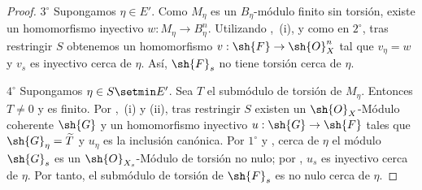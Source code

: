 \begin{proof}
$3^\circ$ Supongamos $\eta\in E'$. Como $M_\eta$ es un $B_\eta$-módulo finito sin torsión, existe un homomorfismo inyectivo $w:M_\eta\to B_\eta^n$. Utilizando ,~(i), y  como en $2^\circ$, tras restringir $S$ obtenemos un homomorfismo $v:\sh{F}\to\sh{O}_X^n$ tal que $v_\eta=w$ y $v_s$ es inyectivo cerca de $\eta$. Así, $\sh{F}_s$ no tiene torsión cerca de $\eta$.

$4^\circ$ Supongamos $\eta\in S\setmin E'$. Sea $T$ el submódulo de torsión de $M_\eta$. Entonces $T\neq 0$ y es finito. Por ,~(i) y (ii), tras restringir $S$ existen un $\sh{O}_X$-Módulo coherente $\sh{G}$ y un homomorfismo inyectivo $u:\sh{G}\to\sh{F}$ tales que $\sh{G}_\eta=\widetilde{T}$ y $u_\eta$ es la inclusión canónica. Por $1^\circ$ y , cerca de $\eta$ el módulo $\sh{G}_s$ es un $\sh{O}_{X_s}$-Módulo de torsión no nulo; por , $u_s$ es inyectivo cerca de $\eta$. Por tanto, el submódulo de torsión de $\sh{F}_s$ es no nulo cerca de $\eta$.
\end{proof}

